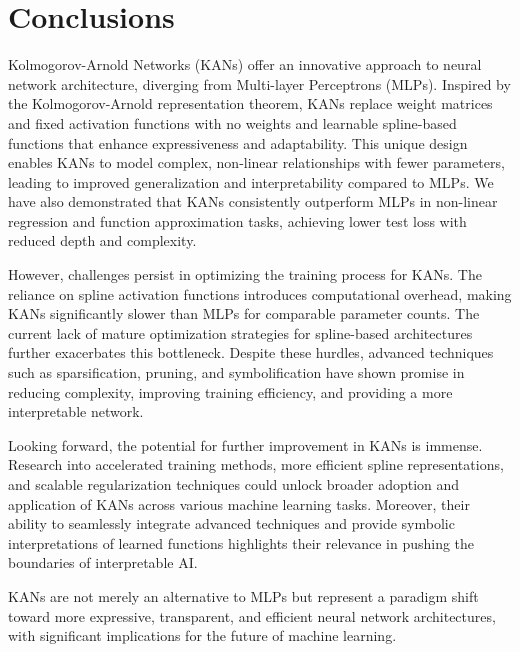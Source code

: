 \section{Conclusions}

Kolmogorov-Arnold Networks (KANs) offer an innovative approach to neural network architecture, diverging from Multi-layer Perceptrons (MLPs). Inspired by the Kolmogorov-Arnold representation theorem, KANs replace weight matrices and fixed activation functions with no weights and learnable spline-based functions that enhance expressiveness and adaptability. This unique design enables KANs to model complex, non-linear relationships with fewer parameters, leading to improved generalization and interpretability compared to MLPs. We have also demonstrated that KANs consistently outperform MLPs in non-linear regression and function approximation tasks, achieving lower test loss with reduced depth and complexity.

However, challenges persist in optimizing the training process for KANs. The reliance on spline activation functions introduces computational overhead, making KANs significantly slower than MLPs for comparable parameter counts. The current lack of mature optimization strategies for spline-based architectures further exacerbates this bottleneck. Despite these hurdles, advanced techniques such as sparsification, pruning, and symbolification have shown promise in reducing complexity, improving training efficiency, and providing a more interpretable network.

Looking forward, the potential for further improvement in KANs is immense. Research into accelerated training methods, more efficient spline representations, and scalable regularization techniques could unlock broader adoption and application of KANs across various machine learning tasks. Moreover, their ability to seamlessly integrate advanced techniques and provide symbolic interpretations of learned functions highlights their relevance in pushing the boundaries of interpretable AI.

KANs are not merely an alternative to MLPs but represent a paradigm shift toward more expressive, transparent, and efficient neural network architectures, with significant implications for the future of machine learning.
